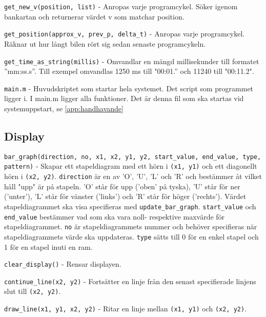 
\texttt{get\_new\_v(position, list)} - Anropas varje programcykel. Söker igenom
bankartan och returnerar värdet v som matchar position.

\texttt{get\_position(approx\_v, prev\_p, delta\_t)} - Anropas varje
programcykel. Räknar ut hur långt bilen rört sig sedan senaste programcykeln.


\texttt{get\_time\_as\_string(millis)} - Omvandlar en mängd millisekunder till
formatet ''mm:ss.s''. Till exempel omvandlas 1250 ms till "00:01.'' och 11240 till
"00:11.2".

\texttt{main.m} - Huvudskriptet som startar hela systemet. Det script som
programmet ligger i. I main.m ligger alla funktioner. Det är denna fil som ska
startas vid systemuppstart, se \ref{app:handhavande}

\subsection{Display}
\label{app:funktioner och filer:display}

\texttt{bar\_graph(direction, no, x1, x2, y1, y2, start\_value, end\_value,
type, pattern)} - Skapar ett stapeldiagram med ett hörn i \texttt{(x1, y1)} och ett
diagonellt hörn i \texttt{(x2, y2)}. \texttt{direction} är en av 'O', 'U', 'L' och 'R' och
bestämmer åt vilket håll "upp" är på stapeln. 'O' står för upp ('oben' på
tyska), 'U' står för ner ('unter'), 'L' står för vänster ('links') och 'R' står
för höger ('rechts'). Värdet stapeldiagrammet ska visa specifieras med
\texttt{update\_bar\_graph}. \texttt{start\_value} och \texttt{end\_value}
bestämmer vad som ska vara noll- respektive maxvärde för stapeldiagrammet.
\texttt{no} är stapeldiagrammets nummer och behöver specifieras när
stapeldiagrammets värde ska uppdateras. \texttt{type} sätts till 0 för en enkel stapel
och 1 för en stapel inuti en ram.

\texttt{clear\_display()} - Rensar displayen.

\texttt{continue\_line(x2, y2)} - Fortsätter en linje från den senast specifierade
linjens slut till \texttt{(x2, y2)}.

\texttt{draw\_line(x1, y1, x2, y2)} - Ritar en linje mellan \texttt{(x1, y1)} och
\texttt{(x2, y2)}.

